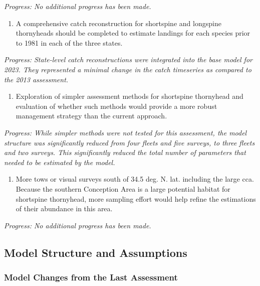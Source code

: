 \documentclass[11pt,
  letterpaper,
]{article}
\providecommand{\tightlist}{%
  \setlength{\itemsep}{0pt}\setlength{\parskip}{0pt}}
\providecommand{\tightlist}{%
  \setlength{\itemsep}{0pt}\setlength{\parskip}{0pt}}
\begin{document}
\emph{Progress: No additional progress has been made.}

\begin{enumerate}
\def\labelenumi{\arabic{enumi}.}
\setcounter{enumi}{5}
\tightlist
\item
  A comprehensive catch reconstruction for shortspine and longspine thornyheads should be completed to estimate landings for each species prior to 1981 in each of the three states.
\end{enumerate}

\emph{Progress: State-level catch reconstructions were integrated into the base model for 2023. They represented a minimal change in the catch timeseries as compared to the 2013 assessment.}

\begin{enumerate}
\def\labelenumi{\arabic{enumi}.}
\setcounter{enumi}{6}
\tightlist
\item
  Exploration of simpler assessment methods for shortspine thornyhead and evaluation of whether such methods would provide a more robust management strategy than the current approach.
\end{enumerate}

\emph{Progress: While simpler methods were not tested for this assessment, the model structure was significantly reduced from four fleets and five surveys, to three fleets and two surveys. This significantly reduced the total number of parameters that needed to be estimated by the model.}

\begin{enumerate}
\def\labelenumi{\arabic{enumi}.}
\setcounter{enumi}{7}
\tightlist
\item
  More tows or visual surveys south of 34.5 deg. N. lat. including the large \gls{cca}. Because the southern Conception Area is a large potential habitat for shortspine thornyhead, more sampling effort would help refine the estimations of their abundance in this area.
\end{enumerate}

\emph{Progress: No additional progress has been made.}

\hypertarget{model-structure-and-assumptions}{%
\subsection{Model Structure and Assumptions}\label{model-structure-and-assumptions}}

\hypertarget{model-changes-from-the-last-assessment}{%
\subsubsection{Model Changes from the Last Assessment}\label{model-changes-from-the-last-assessment}}
\end{document}
